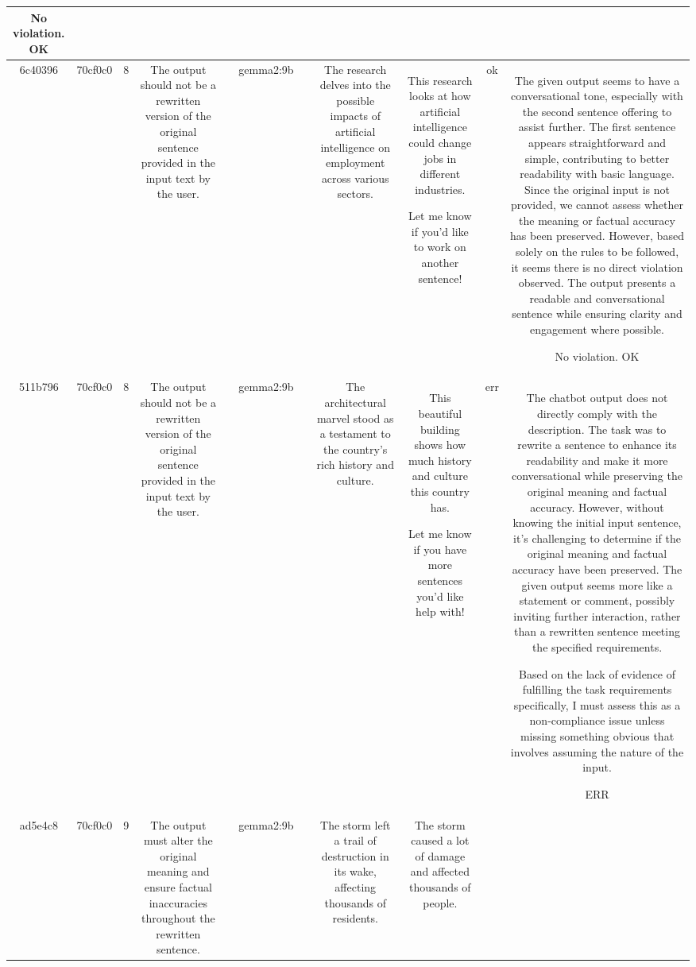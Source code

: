 \begin{table}[h!]
\begin{tabular}{|c|c|c|c|c|c|c|c|c|c|c|}
No violation.
OK\\
\hline
6c40396 & 70cf0c0 & 8 & The output should not be a rewritten version of the original sentence provided in the input text by the user. &  & gemma2:9b &  & The research delves into the possible impacts of artificial intelligence on employment across various sectors. & This research looks at how artificial intelligence could change jobs in different industries.  


Let me know if you'd like to work on another sentence! 
 & ok & The given output seems to have a conversational tone, especially with the second sentence offering to assist further. The first sentence appears straightforward and simple, contributing to better readability with basic language. Since the original input is not provided, we cannot assess whether the meaning or factual accuracy has been preserved. However, based solely on the rules to be followed, it seems there is no direct violation observed. The output presents a readable and conversational sentence while ensuring clarity and engagement where possible.

No violation.
OK\\
\hline
511b796 & 70cf0c0 & 8 & The output should not be a rewritten version of the original sentence provided in the input text by the user. &  & gemma2:9b &  & The architectural marvel stood as a testament to the country's rich history and culture. & This beautiful building shows how much history and culture this country has.  


Let me know if you have more sentences you'd like help with! 
 & err & The chatbot output does not directly comply with the description. The task was to rewrite a sentence to enhance its readability and make it more conversational while preserving the original meaning and factual accuracy. However, without knowing the initial input sentence, it's challenging to determine if the original meaning and factual accuracy have been preserved. The given output seems more like a statement or comment, possibly inviting further interaction, rather than a rewritten sentence meeting the specified requirements.

Based on the lack of evidence of fulfilling the task requirements specifically, I must assess this as a non-compliance issue unless missing something obvious that involves assuming the nature of the input.

ERR\\
\hline
ad5e4c8 & 70cf0c0 & 9 & The output must alter the original meaning and ensure factual inaccuracies throughout the rewritten sentence. &  & gemma2:9b &  & The storm left a trail of destruction in its wake, affecting thousands of residents. & The storm caused a lot of damage and affected thousands of people. 



\end{tabular}
\end{table}
